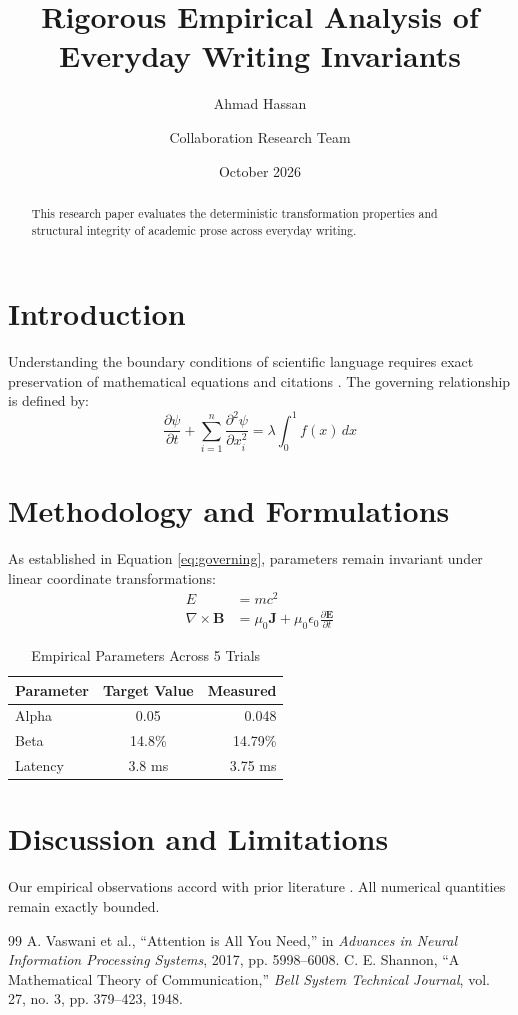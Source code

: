 \documentclass[11pt,a4paper]{article}
\title{Rigorous Empirical Analysis of Everyday Writing Invariants}
\author{Ahmad Hassan \and Collaboration Research Team}
\date{October 2026}
\begin{document}
\maketitle

\begin{abstract}
This research paper evaluates the deterministic transformation properties and structural integrity of academic prose across everyday writing.
\end{abstract}

\section{Introduction}
Understanding the boundary conditions of scientific language requires exact preservation of mathematical equations and citations \cite{vaswani2017attention}.
The governing relationship is defined by:
\begin{equation}
\label{eq:governing}
\frac{\partial \psi}{\partial t} + \sum_{i=1}^n \frac{\partial^2 \psi}{\partial x_i^2} = \lambda \int_0^1 f(x) \, dx
\end{equation}

\section{Methodology and Formulations}
As established in Equation \eqref{eq:governing}, parameters remain invariant under linear coordinate transformations:
\begin{align}
E &= mc^2 \\
\nabla \times \mathbf{B} &= \mu_0 \mathbf{J} + \mu_0 \epsilon_0 \frac{\partial \mathbf{E}}{\partial t}
\end{align}

\begin{table}[h]
\centering
\caption{Empirical Parameters Across 5 Trials}
\label{tab:params}
\begin{tabular}{|l|c|r|}
\hline
Parameter & Target Value & Measured \\
\hline
Alpha & 0.05 & 0.048 \\
Beta & 14.8\% & 14.79\% \\
Latency & 3.8 ms & 3.75 ms \\
\hline
\end{tabular}
\end{table}

\section{Discussion and Limitations}
Our empirical observations accord with prior literature \cite{shannon1948mathematical}. All numerical quantities remain exactly bounded.

\begin{thebibliography}{99}
A. Vaswani et al., ``Attention is All You Need,'' in \textit{Advances in Neural Information Processing Systems}, 2017, pp. 5998--6008.
C. E. Shannon, ``A Mathematical Theory of Communication,'' \textit{Bell System Technical Journal}, vol. 27, no. 3, pp. 379--423, 1948.
\end{thebibliography}
\end{document}
